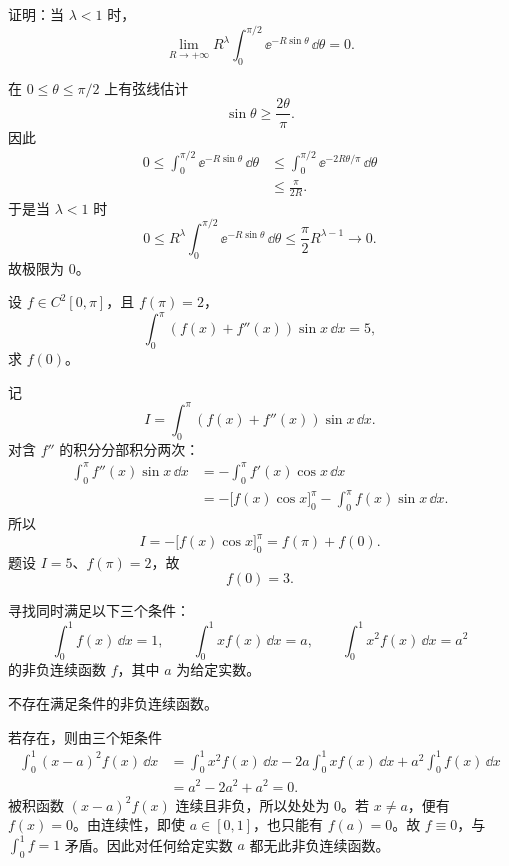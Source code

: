 \begin{xreferenceproblem}[19]
证明：当 $\lambda<1$ 时，
\[
  \lim_{R\to+\infty}R^\lambda\int_0^{\pi/2}\ee^{-R\sin\theta}\,\dd\theta=0.
\]
\end{xreferenceproblem}
\begin{xsolution}
在 $0\leqslant\theta\leqslant\pi/2$ 上有弦线估计
\[
  \sin\theta\geqslant\frac{2\theta}{\pi}.
\]
因此
\begin{align*}
  0\leqslant
  \int_0^{\pi/2}\ee^{-R\sin\theta}\,\dd\theta
  &\leqslant\int_0^{\pi/2}\ee^{-2R\theta/\pi}\,\dd\theta\\
  &\leqslant\frac\pi{2R}.
\end{align*}
于是当 $\lambda<1$ 时
\[
  0\leqslant R^\lambda\int_0^{\pi/2}\ee^{-R\sin\theta}\,\dd\theta
  \leqslant\frac\pi2R^{\lambda-1}\to0.
\]
故极限为 $\boxed{0}$。
\end{xsolution}


\begin{xreferenceproblem}[20]
设 $f\in C^2[0,\pi]$，且 $f(\pi)=2$，
\[
  \int_0^\pi(f(x)+f''(x))\sin x\,\dd x=5,
\]
求 $f(0)$。
\end{xreferenceproblem}
\begin{xsolution}
记
\[
  I=\int_0^\pi(f(x)+f''(x))\sin x\,\dd x.
\]
对含 $f''$ 的积分分部积分两次：
\begin{align*}
  \int_0^\pi f''(x)\sin x\,\dd x
  &=-\int_0^\pi f'(x)\cos x\,\dd x\\
  &=-\bigl[f(x)\cos x\bigr]_0^\pi
  -\int_0^\pi f(x)\sin x\,\dd x.
\end{align*}
所以
\[
  I=-\bigl[f(x)\cos x\bigr]_0^\pi
  =f(\pi)+f(0).
\]
题设 $I=5$、$f(\pi)=2$，故
\[
  \boxed{f(0)=3}.
\]
\end{xsolution}


\begin{xreferenceproblem}[21]
寻找同时满足以下三个条件：
\[
  \int_0^1 f(x)\,\dd x=1,
  \qquad
  \int_0^1xf(x)\,\dd x=a,
  \qquad
  \int_0^1x^2f(x)\,\dd x=a^2
\]
的非负连续函数 $f$，其中 $a$ 为给定实数。
\end{xreferenceproblem}
\begin{xsolution}
不存在满足条件的非负连续函数。

若存在，则由三个矩条件
\begin{align*}
  \int_0^1(x-a)^2f(x)\,\dd x
  &=\int_0^1x^2f(x)\,\dd x
  -2a\int_0^1xf(x)\,\dd x
  +a^2\int_0^1f(x)\,\dd x\\
  &=a^2-2a^2+a^2=0.
\end{align*}
被积函数 $(x-a)^2f(x)$ 连续且非负，所以处处为 $0$。若 $x\ne a$，便有 $f(x)=0$。由连续性，即使 $a\in[0,1]$，也只能有 $f(a)=0$。故 $f\equiv0$，与 $\int_0^1f=1$ 矛盾。因此对任何给定实数 $a$ 都无此非负连续函数。
\end{xsolution}


